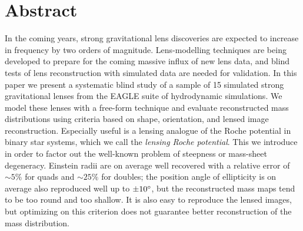 
\clearpage


\def\pwidth{.66\textwidth}
\def\qwidth{.49\textwidth}
\def\pheight{.19\textheight}


\section*{Abstract}
  \noindent In the coming years, strong gravitational lens discoveries are
  expected to increase in frequency by two orders of magnitude.  Lens-modelling
  techniques are being developed to prepare for the coming massive influx of new
  lens data, and blind tests of lens reconstruction with simulated data are
  needed for validation.  In this paper we present a systematic blind study of a
  sample of 15 simulated strong gravitational lenses from the EAGLE suite of
  hydrodynamic simulations.  We model these lenses with a free-form technique
  and evaluate reconstructed mass distributions using criteria based on shape,
  orientation, and lensed image reconstruction.  Especially useful is a lensing
  analogue of the Roche potential in binary star systems, which we call the {\em
  lensing Roche potential}.  This we introduce in order to factor out the
  well-known problem of steepness or mass-sheet degeneracy.  Einstein radii are
  on average well recovered with a relative error of ${\sim}5\%$ for quads and
  ${\sim}25\%$ for doubles; the position angle of ellipticity is on average also
  reproduced well up to $\pm10^\circ$, but the reconstructed mass maps tend to
  be too round and too shallow.  It is also easy to reproduce the lensed images,
  but optimizing on this criterion does not guarantee better reconstruction of
  the mass distribution.


